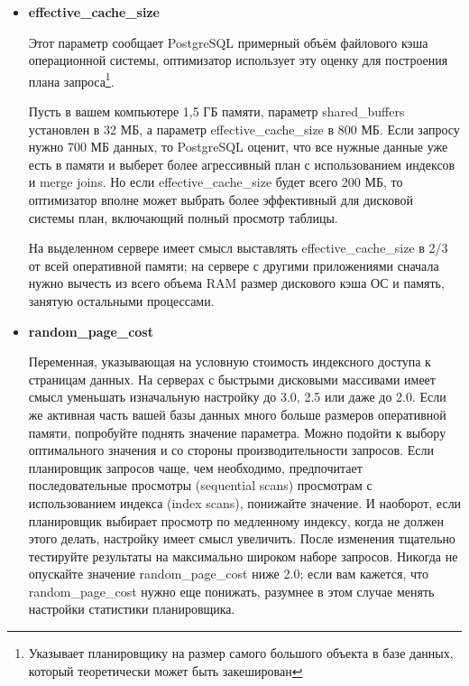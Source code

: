\begin{itemize}
\item \textbf{effective\_cache\_size}

Этот параметр сообщает PostgreSQL примерный объём файлового кэша операционной системы, оптимизатор использует эту оценку для 
построения плана запроса\footnote{Указывает планировщику на размер самого большого объекта в базе данных, который 
теоретически может быть закеширован}.

Пусть в вашем компьютере 1,5 ГБ памяти, параметр shared\_buffers установлен в 32 МБ, а параметр effective\_cache\_size в 800 МБ. 
Если запросу нужно 700 МБ данных, то PostgreSQL оценит, что все нужные данные уже есть в памяти и выберет более агрессивный план с 
использованием индексов и merge joins. Но если effective\_cache\_size будет всего 200 МБ, то оптимизатор вполне может выбрать более 
эффективный для дисковой системы план, включающий полный просмотр таблицы.

На выделенном сервере имеет смысл выставлять effective\_cache\_size в 2/3 от всей оперативной памяти; на сервере с 
другими приложениями сначала нужно вычесть из всего объема RAM размер дискового кэша ОС и память, 
занятую остальными процессами.

\item \textbf{random\_page\_cost} 

Переменная, указывающая на условную стоимость индексного доступа к страницам данных. На серверах с быстрыми дисковыми 
массивами имеет смысл уменьшать изначальную настройку до 3.0, 2.5 или даже до 2.0. Если же активная часть вашей базы данных 
много больше размеров оперативной памяти, попробуйте поднять значение параметра. Можно подойти к выбору оптимального значения 
и со стороны производительности запросов. Если планировщик запросов чаще, чем необходимо, предпочитает последовательные просмотры 
(sequential scans) просмотрам с использованием индекса (index scans), понижайте значение. И наоборот, если планировщик выбирает 
просмотр по медленному индексу, когда не должен этого делать, настройку имеет смысл увеличить. После изменения тщательно тестируйте 
результаты на максимально широком наборе запросов. Никогда не опускайте значение random\_page\_cost ниже 2.0; если вам кажется, 
что random\_page\_cost нужно еще понижать, разумнее в этом случае менять настройки статистики планировщика. 
\end{itemize}


